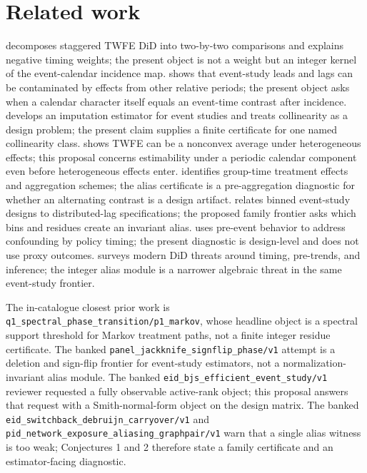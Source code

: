 \documentclass[11pt]{article}
\theoremstyle{definition}
\theoremstyle{plain}
\theoremstyle{remark}
\begin{document}
\section{Related work}
\citet{GoodmanBacon2021Timing} decomposes staggered TWFE DiD into two-by-two comparisons and explains negative timing weights; the present object is not a weight but an integer kernel of the event-calendar incidence map. \citet{SunAbraham2021EventStudies} shows that event-study leads and lags can be contaminated by effects from other relative periods; the present object asks when a calendar character itself equals an event-time contrast after incidence. \citet{BorusyakJaravelSpiess2024Revisiting} develops an imputation estimator for event studies and treats collinearity as a design problem; the present claim supplies a finite certificate for one named collinearity class. \citet{DeChaisemartinDHaultfoeuille2020TWFE} shows TWFE can be a nonconvex average under heterogeneous effects; this proposal concerns estimability under a periodic calendar component even before heterogeneous effects enter. \citet{CallawaySantAnna2021MultiplePeriods} identifies group-time treatment effects and aggregation schemes; the alias certificate is a pre-aggregation diagnostic for whether an alternating contrast is a design artifact. \citet{SchmidheinySiegloch2023EventStudies} relates binned event-study designs to distributed-lag specifications; the proposed family frontier asks which bins and residues create an invariant alias. \citet{FreyaldenhovenHansenShapiro2019PreEvent} uses pre-event behavior to address confounding by policy timing; the present diagnostic is design-level and does not use proxy outcomes. \citet{RothSantAnnaBilinskiPoe2023WhatsTrending} surveys modern DiD threats around timing, pre-trends, and inference; the integer alias module is a narrower algebraic threat in the same event-study frontier.

The in-catalogue closest prior work is \texttt{q1\_spectral\_phase\_transition/p1\_markov}, whose headline object is a spectral support threshold for Markov treatment paths, not a finite integer residue certificate. The banked \texttt{panel\_jackknife\_signflip\_phase/v1} attempt is a deletion and sign-flip frontier for event-study estimators, not a normalization-invariant alias module. The banked \texttt{eid\_bjs\_efficient\_event\_study/v1} reviewer requested a fully observable active-rank object; this proposal answers that request with a Smith-normal-form object on the design matrix. The banked \texttt{eid\_switchback\_debruijn\_carryover/v1} and \texttt{pid\_network\_exposure\_aliasing\_graphpair/v1} warn that a single alias witness is too weak; Conjectures 1 and 2 therefore state a family certificate and an estimator-facing diagnostic.
\end{document}

